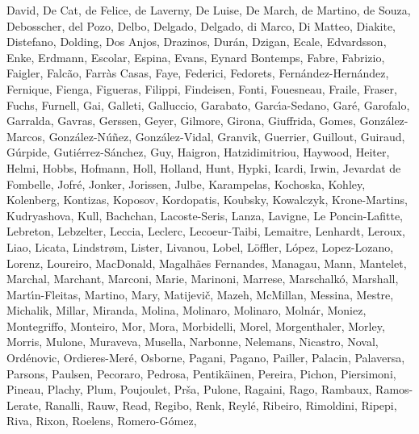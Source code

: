 \documentclass[twocolumn]{aastex62}
\begin{document}
\begin{thebibliography}{}
{  {David}, {De Cat}, {de Felice}, {de Laverny}, {De Luise}, {De March}, {de
  Martino}, {de Souza}, {Debosscher}, {del Pozo}, {Delbo}, {Delgado},
  {Delgado}, {di Marco}, {Di Matteo}, {Diakite}, {Distefano}, {Dolding}, {Dos
  Anjos}, {Drazinos}, {Dur{\'a}n}, {Dzigan}, {Ecale}, {Edvardsson}, {Enke},
  {Erdmann}, {Escolar}, {Espina}, {Evans}, {Eynard Bontemps}, {Fabre},
  {Fabrizio}, {Faigler}, {Falc{\~a}o}, {Farr{\`a}s Casas}, {Faye}, {Federici},
  {Fedorets}, {Fern{\'a}ndez-Hern{\'a}ndez}, {Fernique}, {Fienga}, {Figueras},
  {Filippi}, {Findeisen}, {Fonti}, {Fouesneau}, {Fraile}, {Fraser}, {Fuchs},
  {Furnell}, {Gai}, {Galleti}, {Galluccio}, {Garabato}, {Garc{\'\i}a-Sedano},
  {Gar{\'e}}, {Garofalo}, {Garralda}, {Gavras}, {Gerssen}, {Geyer}, {Gilmore},
  {Girona}, {Giuffrida}, {Gomes}, {Gonz{\'a}lez-Marcos},
  {Gonz{\'a}lez-N{\'u}{\~n}ez}, {Gonz{\'a}lez-Vidal}, {Granvik}, {Guerrier},
  {Guillout}, {Guiraud}, {G{\'u}rpide}, {Guti{\'e}rrez-S{\'a}nchez}, {Guy},
  {Haigron}, {Hatzidimitriou}, {Haywood}, {Heiter}, {Helmi}, {Hobbs},
  {Hofmann}, {Holl}, {Holland}, {Hunt}, {Hypki}, {Icardi}, {Irwin}, {Jevardat
  de Fombelle}, {Jofr{\'e}}, {Jonker}, {Jorissen}, {Julbe}, {Karampelas},
  {Kochoska}, {Kohley}, {Kolenberg}, {Kontizas}, {Koposov}, {Kordopatis},
  {Koubsky}, {Kowalczyk}, {Krone-Martins}, {Kudryashova}, {Kull}, {Bachchan},
  {Lacoste-Seris}, {Lanza}, {Lavigne}, {Le Poncin-Lafitte}, {Lebreton},
  {Lebzelter}, {Leccia}, {Leclerc}, {Lecoeur-Taibi}, {Lemaitre}, {Lenhardt},
  {Leroux}, {Liao}, {Licata}, {Lindstr{\o}m}, {Lister}, {Livanou}, {Lobel},
  {L{\"o}ffler}, {L{\'o}pez}, {Lopez-Lozano}, {Lorenz}, {Loureiro},
  {MacDonald}, {Magalh{\~a}es Fernandes}, {Managau}, {Mann}, {Mantelet},
  {Marchal}, {Marchant}, {Marconi}, {Marie}, {Marinoni}, {Marrese},
  {Marschalk{\'o}}, {Marshall}, {Mart{\'\i}n-Fleitas}, {Martino}, {Mary},
  {Matijevi{\v{c}}}, {Mazeh}, {McMillan}, {Messina}, {Mestre}, {Michalik},
  {Millar}, {Miranda}, {Molina}, {Molinaro}, {Molinaro}, {Moln{\'a}r},
  {Moniez}, {Montegriffo}, {Monteiro}, {Mor}, {Mora}, {Morbidelli}, {Morel},
  {Morgenthaler}, {Morley}, {Morris}, {Mulone}, {Muraveva}, {Musella},
  {Narbonne}, {Nelemans}, {Nicastro}, {Noval}, {Ord{\'e}novic},
  {Ordieres-Mer{\'e}}, {Osborne}, {Pagani}, {Pagano}, {Pailler}, {Palacin},
  {Palaversa}, {Parsons}, {Paulsen}, {Pecoraro}, {Pedrosa}, {Pentik{\"a}inen},
  {Pereira}, {Pichon}, {Piersimoni}, {Pineau}, {Plachy}, {Plum}, {Poujoulet},
  {Pr{\v{s}}a}, {Pulone}, {Ragaini}, {Rago}, {Rambaux}, {Ramos-Lerate},
  {Ranalli}, {Rauw}, {Read}, {Regibo}, {Renk}, {Reyl{\'e}}, {Ribeiro},
  {Rimoldini}, {Ripepi}, {Riva}, {Rixon}, {Roelens}, {Romero-G{\'o}mez},
}
\end{thebibliography}
\end{document}
